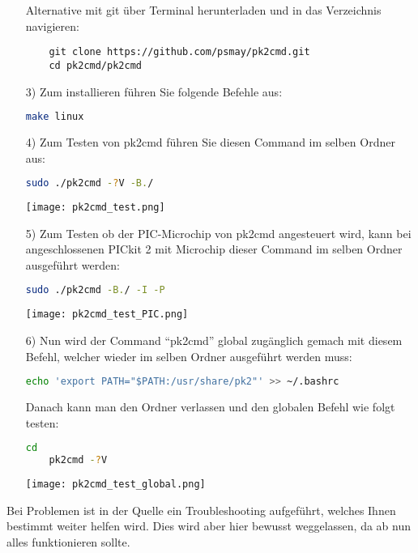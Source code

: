 \begin{itemize}
    Alternative mit git über Terminal herunterladen und in das Verzeichnis navigieren:
    \begin{lstlisting}
    git clone https://github.com/psmay/pk2cmd.git
    cd pk2cmd/pk2cmd
    \end{lstlisting}
    \item[3)] Zum installieren führen Sie folgende Befehle aus:
    \begin{lstlisting}[language=bash]
    make linux
    \end{lstlisting}
    \item[4)] Zum Testen von pk2cmd führen Sie diesen Command im selben Ordner aus:
    \begin{lstlisting}[language=bash]
    sudo ./pk2cmd -?V -B./
    \end{lstlisting}
    \begin{center}
        \texttt{[image: pk2cmd\_test.png]}
    \end{center}
    \newpage
    \item[5)] Zum Testen ob der PIC-Microchip von {\ttfamily pk2cmd} angesteuert wird, kann bei angeschlossenen PICkit 2 mit Microchip dieser Command im selben Ordner ausgeführt werden:
    \begin{lstlisting}[language=bash]
    sudo ./pk2cmd -B./ -I -P
    \end{lstlisting}
    \begin{center}
        \texttt{[image: pk2cmd\_test\_PIC.png]}
    \end{center}
    \item[6)] Nun wird der Command \enquote{pk2cmd} global zugänglich gemach mit diesem Befehl, welcher wieder im selben Ordner ausgeführt werden muss:
    \begin{lstlisting}[language=bash]
    echo 'export PATH="$PATH:/usr/share/pk2"' >> ~/.bashrc
    \end{lstlisting}
    Danach kann man den Ordner verlassen und den globalen Befehl wie folgt testen:
    \begin{lstlisting}[language=bash]
    cd
    pk2cmd -?V
    \end{lstlisting}
    \begin{center}
       \texttt{[image: pk2cmd\_test\_global.png]}
    \end{center}
\end{itemize}
Bei Problemen ist in der Quelle ein Troubleshooting aufgeführt, welches Ihnen bestimmt weiter helfen wird. Dies wird aber hier bewusst weggelassen, da ab nun alles funktionieren sollte.
\newpage
